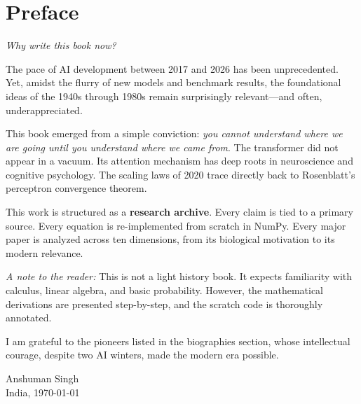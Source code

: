 \chapter*{Preface}

\textit{Why write this book now?}

The pace of AI development between 2017 and 2026 has been unprecedented. Yet, amidst the flurry of new models and benchmark results, the foundational ideas of the 1940s through 1980s remain surprisingly relevant—and often, underappreciated.

This book emerged from a simple conviction: \textit{you cannot understand where we are going until you understand where we came from}. The transformer did not appear in a vacuum. Its attention mechanism has deep roots in neuroscience and cognitive psychology. The scaling laws of 2020 trace directly back to Rosenblatt's perceptron convergence theorem.

This work is structured as a \textbf{research archive}. Every claim is tied to a primary source. Every equation is re-implemented from scratch in NumPy. Every major paper is analyzed across ten dimensions, from its biological motivation to its modern relevance.

\textit{A note to the reader:} This is not a light history book. It expects familiarity with calculus, linear algebra, and basic probability. However, the mathematical derivations are presented step-by-step, and the scratch code is thoroughly annotated.

I am grateful to the pioneers listed in the biographies section, whose intellectual courage, despite two AI winters, made the modern era possible.

\begin{flushright}
Anshuman Singh\\
India, \today
\end{flushright}